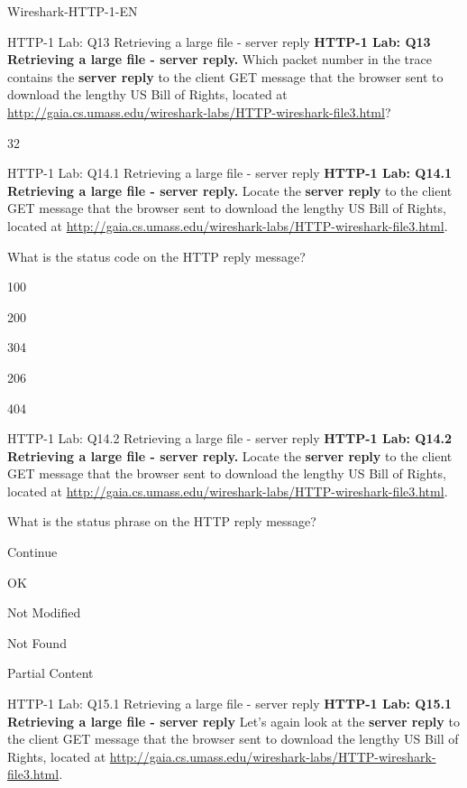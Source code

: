 \documentclass[a4paper]{article}
\begin{document}
\begin{quiz}{Wireshark-HTTP-1-EN}
\begin{shortanswer}[points=1]{HTTP-1 Lab: Q13 Retrieving a large file - server reply}
\textbf{HTTP-1 Lab: Q13 Retrieving a large file - server reply.} Which packet number in the trace contains the \textbf{server reply} to the client GET message that the browser sent to download the lengthy US Bill of Rights, located at \href{http://gaia.cs.umass.edu/wireshark-labs/HTTP-wireshark-file3.html}{http://gaia.cs.umass.edu/wireshark-labs/HTTP-wireshark-file3.html}? 
\item 32
\end{shortanswer}

\begin{multi}[points=1,shuffle]{HTTP-1 Lab: Q14.1 Retrieving a large file - server reply}
\textbf{HTTP-1 Lab: Q14.1 Retrieving a large file - server reply.} Locate the \textbf{server reply} to the client GET message that the browser sent to download the lengthy US Bill of Rights, located at \href{http://gaia.cs.umass.edu/wireshark-labs/HTTP-wireshark-file3.html}{http://gaia.cs.umass.edu/wireshark-labs/HTTP-wireshark-file3.html}. 

What is the status code on the HTTP reply message? 
\item 100
\item* 200
\item 304
\item 206
\item 404
\end{multi}

\begin{multi}[points=1,shuffle]{HTTP-1 Lab: Q14.2 Retrieving a large file - server reply}
\textbf{HTTP-1 Lab: Q14.2 Retrieving a large file - server reply.} Locate the \textbf{server reply} to the client GET message that the browser sent to download the lengthy US Bill of Rights, located at \href{http://gaia.cs.umass.edu/wireshark-labs/HTTP-wireshark-file3.html}{http://gaia.cs.umass.edu/wireshark-labs/HTTP-wireshark-file3.html}.

What is the status phrase on the HTTP reply message? 
\item Continue
\item* OK
\item Not Modified
\item Not Found
\item Partial Content
\end{multi}
	
\begin{shortanswer}[points=1]{HTTP-1 Lab: Q15.1 Retrieving a large file - server reply}
\textbf{HTTP-1 Lab: Q15.1 Retrieving a large file - server reply} Let's again look at the \textbf{server reply} to the client GET message that the browser sent to download the lengthy US Bill of Rights, located at  \href{http://gaia.cs.umass.edu/wireshark-labs/HTTP-wireshark-file3.html}{http://gaia.cs.umass.edu/wireshark-labs/HTTP-wireshark-file3.html}.


\end{shortanswer}
\end{quiz}
\end{document}
